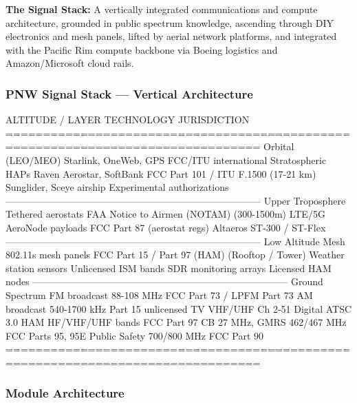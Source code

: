 \documentclass[11pt,letterpaper]{article}
\begin{document}
\textbf{The Signal Stack:} A vertically integrated communications and compute architecture, grounded in public spectrum knowledge, ascending through DIY electronics and mesh panels, lifted by aerial network platforms, and integrated with the Pacific Rim compute backbone via Boeing logistics and Amazon/Microsoft cloud rails.

\subsubsection{PNW Signal Stack --- Vertical Architecture}

\begin{asciibox}
ALTITUDE / LAYER        TECHNOLOGY                    JURISDICTION
================================================================================
Orbital (LEO/MEO)    Starlink, OneWeb, GPS          FCC/ITU international
Stratospheric HAPs   Raven Aerostar, SoftBank        FCC Part 101 / ITU F.1500
(17-21 km)           Sunglider, Sceye airship        Experimental authorizations
--------------------------------------------------------------------------------
Upper Troposphere    Tethered aerostats              FAA Notice to Airmen (NOTAM)
(300-1500m)          LTE/5G AeroNode payloads        FCC Part 87 (aerostat regs)
                     Altaeros ST-300 / ST-Flex
--------------------------------------------------------------------------------
Low Altitude Mesh    802.11s mesh panels             FCC Part 15 / Part 97 (HAM)
(Rooftop / Tower)    Weather station sensors         Unlicensed ISM bands
                     SDR monitoring arrays           Licensed HAM nodes
--------------------------------------------------------------------------------
Ground Spectrum      FM broadcast 88-108 MHz         FCC Part 73 / LPFM Part 73
                     AM broadcast 540-1700 kHz       Part 15 unlicensed
                     TV VHF/UHF Ch 2-51              Digital ATSC 3.0
                     HAM HF/VHF/UHF bands            FCC Part 97
                     CB 27 MHz, GMRS 462/467 MHz     FCC Parts 95, 95E
                     Public Safety 700/800 MHz        FCC Part 90
================================================================================
\end{asciibox}

\subsubsection{Module Architecture}
\end{document}
